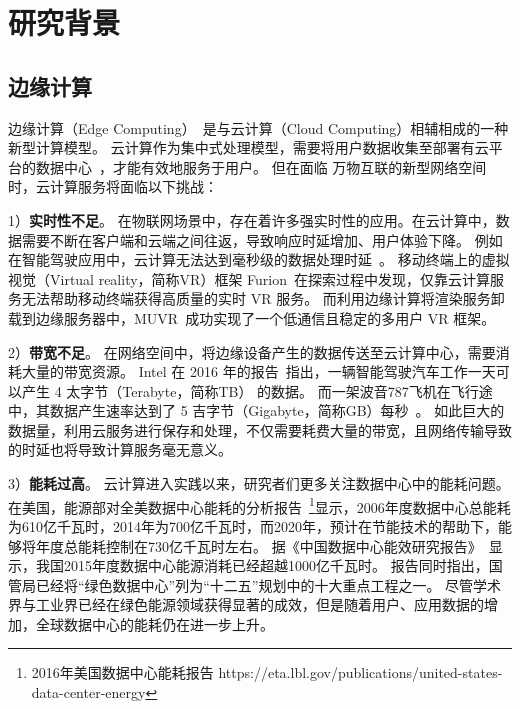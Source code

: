 
\section{研究背景}

\subsection{边缘计算}
边缘计算（Edge Computing）~\cite{DBLP:journals/cacm/ArmbrustFGJKKLPRSZ10}是与云计算（Cloud Computing）相辅相成的一种新型计算模型。
云计算作为集中式处理模型，需要将用户数据收集至部署有云平台的数据中心~\cite{DBLP:conf/icdcs/Montresor16}，才能有效地服务于用户。
但在面临 万物互联的新型网络空间时，云计算服务将面临以下挑战：

1）\textbf{实时性不足}。
在物联网场景中，存在着许多强实时性的应用。在云计算中，数据需要不断在客户端和云端之间往返，导致响应时延增加、用户体验下降。
例如在智能驾驶应用中，云计算无法达到毫秒级的数据处理时延~\cite{DBLP:conf/cvpr/GeigerLU12}。
移动终端上的虚拟视觉（Virtual reality，简称VR）框架 Furion~\cite{DBLP:conf/mobicom/LaiHCSD17}在探索过程中发现，仅靠云计算服务无法帮助移动终端获得高质量的实时 VR 服务。
而利用边缘计算将渲染服务卸载到边缘服务器中，MUVR~\cite{DBLP:conf/edge/LiG18}成功实现了一个低通信且稳定的多用户 VR 框架。

2）\textbf{带宽不足}。
在网络空间中，将边缘设备产生的数据传送至云计算中心，需要消耗大量的带宽资源。
Intel 在 2016 年的报告~\cite{DBLP:journals/micro/KatoTINTH15}指出，一辆智能驾驶汽车工作一天可以产生 4 太字节（Terabyte，简称TB） 的数据。
而一架波音787飞机在飞行途中，其数据产生速率达到了 5 吉字节（Gigabyte，简称GB）每秒~\cite{JCRD/shi17}。
如此巨大的数据量，利用云服务进行保存和处理，不仅需要耗费大量的带宽，且网络传输导致的时延也将导致计算服务毫无意义。

3）\textbf{能耗过高}。
云计算进入实践以来，研究者们更多关注数据中心中的能耗问题。
在美国，能源部对全美数据中心能耗的分析报告~\footnote{2016年美国数据中心能耗报告 https://eta.lbl.gov/publications/united-states-data-center-energy}显示，2006年度数据中心总能耗为610亿千瓦时，2014年为700亿千瓦时，而2020年，预计在节能技术的帮助下，能够将年度总能耗控制在730亿千瓦时左右。
据《中国数据中心能效研究报告》~\cite{whitebooks/cn15}显示，我国2015年度数据中心能源消耗已经超越1000亿千瓦时。
报告同时指出，国管局已经将“绿色数据中心”列为“十二五”规划中的十大重点工程之一。
尽管学术界与工业界已经在绿色能源领域获得显著的成效，但是随着用户、应用数据的增加，全球数据中心的能耗仍在进一步上升。

